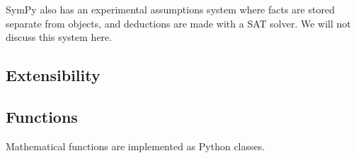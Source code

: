 SymPy also has an experimental assumptions system where facts are stored
separate from objects, and deductions are made with a SAT solver. We will not
discuss this system here.

\subsection{Extensibility}

\subsection{Functions}

Mathematical functions are implemented as Python classes.


